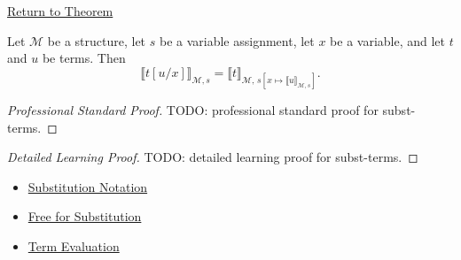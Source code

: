 \newpage
{}
\label{prf:subst-terms}

\begin{remark*}[Return]
\hyperref[lem:subst-terms]{Return to Theorem}
\end{remark*}

\begin{theorem*}
Let \(\mathcal M\) be a structure, let \(s\) be a variable assignment, let
\(x\) be a variable, and let \(t\) and \(u\) be terms. Then
\[
\llbracket t[u/x]\rrbracket_{\mathcal M,s}
=
\llbracket t\rrbracket_{\mathcal M,\,
s[x\mapsto\llbracket u\rrbracket_{\mathcal M,s}]}.
\]
\end{theorem*}

\begin{proof}[Professional Standard Proof]
\LRAProofBodyStart
TODO: professional standard proof for subst-terms.
\end{proof}

\begin{proof}[Detailed Learning Proof]
\LRAProofBodyStart
TODO: detailed learning proof for subst-terms.
\end{proof}

\begin{remark*}
\end{remark*}

\begin{dependencies}
\begin{itemize}
  \item \hyperref[def:subst-notation]{Substitution Notation}
  \item \hyperref[def:free-for]{Free for Substitution}
  \item \hyperref[def:term-interp]{Term Evaluation}
\end{itemize}
\end{dependencies}

\clearpage
